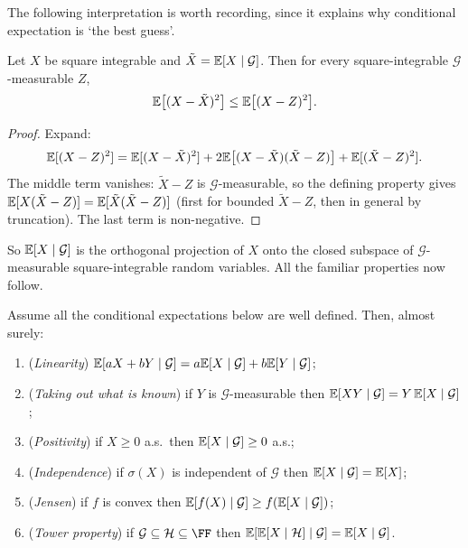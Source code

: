 \documentclass[a4paper]{scrartcl}
\begin{document}
The following interpretation is worth recording, since it explains why conditional expectation is `the best guess'.

\begin{proposition}[$L^2$ projection]
	Let $X$ be square integrable and $\tilde X = \mathbb{E}[X\mid\mathcal{G}]$. Then for every square-integrable $\mathcal{G}$-measurable $Z$,
	$$
	\mathbb{E}\big[(X-\tilde X)^2\big] \leq \mathbb{E}\big[(X - Z)^2\big].
	$$
\end{proposition}

\begin{proof}
	Expand:
	$$
	\mathbb{E}[(X-Z)^2] = \mathbb{E}[(X - \tilde X)^2] + 2\mathbb{E}\big[(X-\tilde X)(\tilde X - Z)\big] + \mathbb{E}[(\tilde X - Z)^2].
	$$
	The middle term vanishes: $\tilde X - Z$ is $\mathcal{G}$-measurable, so the defining property gives $\mathbb{E}[X(\tilde X - Z)] = \mathbb{E}[\tilde X(\tilde X - Z)]$ (first for bounded $\tilde X - Z$, then in general by truncation). The last term is non-negative.
\end{proof}

So $\mathbb{E}[X\mid\mathcal{G}]$ is the orthogonal projection of $X$ onto the closed subspace of $\mathcal{G}$-measurable square-integrable random variables. All the familiar properties now follow.

\begin{proposition}\label{prop:ce-props}
	Assume all the conditional expectations below are well defined. Then, almost surely:
	\begin{enumerate}[label=(\roman*)]
		\item (\emph{Linearity}) $\mathbb{E}[aX + bY \mid \mathcal{G}] = a\mathbb{E}[X\mid\mathcal{G}] + b\mathbb{E}[Y\mid\mathcal{G}]$;
		\item (\emph{Taking out what is known}) if $Y$ is $\mathcal{G}$-measurable then $\mathbb{E}[XY\mid\mathcal{G}] = Y\,\mathbb{E}[X\mid\mathcal{G}]$;
		\item (\emph{Positivity}) if $X \geq 0$ a.s.\ then $\mathbb{E}[X\mid\mathcal{G}]\geq 0$ a.s.;
		\item (\emph{Independence}) if $\sigma(X)$ is independent of $\mathcal{G}$ then $\mathbb{E}[X\mid\mathcal{G}] = \mathbb{E}[X]$;
		\item (\emph{Jensen}) if $f$ is convex then $\mathbb{E}[f(X)\mid\mathcal{G}] \geq f(\mathbb{E}[X\mid\mathcal{G}])$;
		\item (\emph{Tower property}) if $\mathcal{G}\subseteq\mathcal{H}\subseteq\FF$ then $\mathbb{E}[\mathbb{E}[X\mid\mathcal{H}]\mid\mathcal{G}] = \mathbb{E}[X\mid\mathcal{G}]$.
	\end{enumerate}
\end{proposition}
\end{document}
